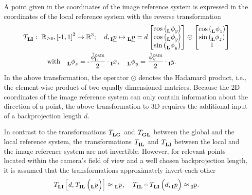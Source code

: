 A point given in the coordinates of the image reference system is expressed
in the coordinates of the local reference system with the reverse transformation
\begin{align} \label{eq:image_to_local_transformation}
    \trafo[]{}{\lrs\irs}{}{}
    &:\ 
    \mathbb{R}_{\ge 0}, \left[ \text{-}1, 1 \right]^2 \rightarrow \mathbb{R}^3
    ; \quad
    d, \pos[]{}{}{\irs}{} \mapsto \pos[]{}{}{\lrs}{}
    =
    d \begin{bmatrix}
        \cos \left( \ang[]{}{y}{\lrs}{} \right) \\
        \cos \left( \ang[]{}{y}{\lrs}{} \right) \\
        \sin \left( \ang[]{}{y}{\lrs}{} \right)
    \end{bmatrix} \odot \begin{bmatrix}
        \cos \left( \ang[]{}{z}{\lrs}{} \right) \\
        \sin \left( \ang[]{}{z}{\lrs}{} \right) \\
        1
    \end{bmatrix}
    \nonumber \\
    & \qquad \text{with} \quad
    \ang[]{}{z}{\lrs}{}
    = 
    \text - \frac{\ang[\user]{\camera}{\text h}{}{}}{2} \cdot \x[]{}{}{\irs}{}
    ,\quad 
    \ang[]{}{y}{\lrs}{}
    = 
    \frac{\ang[\user]{\camera}{\text v}{}{}}{2} \cdot \y[]{}{}{\irs}{}.
\end{align}
In the above transformation,
the operator 
$\odot$ 
denotes the Hadamard product, 
i.e., the element-wise product of two equally dimensioned matrices.
Because the 2D coordinates of the image reference system
can only contain information about the direction of a point,
the above transformation to 3D requires the additional input of a backprojection length $d$.

In contrast to the transformations 
$\trafo[]{}{\lrs\grs}{}{}$
and 
$\trafo[]{}{\grs\lrs}{}{}$
between the global and the local reference system,
the transformations 
$\trafo[]{}{\irs\lrs}{}{}$
and 
$\trafo[]{}{\lrs\irs}{}{}$
between the local and the image reference system
are not invertible.
However, for relevant points
located within the camera's field of view
and a well chosen backprojection length,
it is assumed that the transformations approximately invert each other
\begin{equation}
    \trafo[]{}{\lrs\irs}{}{} \left[
        d, \trafo[]{}{\irs\lrs}{}{} \left( \pos[]{}{}{\lrs}{} \right)
    \right]
    \approx
    \pos[]{}{}{\lrs}{}
    ,\quad
    \trafo[]{}{\irs\lrs}{}{}
    \circ 
    \trafo[]{}{\lrs\irs}{}{} \left(
        d, \pos[]{}{}{\irs}{}
    \right)
    \approx
    \pos[]{}{}{\irs}{}.
\end{equation}





